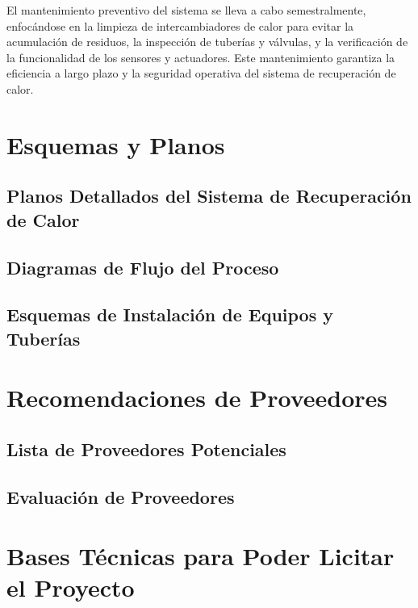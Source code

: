 \documentclass[11pt,a4paper]{article}  %
\begin{document}
El mantenimiento preventivo del sistema se lleva a cabo semestralmente, enfocándose en la limpieza de intercambiadores de calor para evitar la acumulación de residuos, la inspección de tuberías y válvulas, y la verificación de la funcionalidad de los sensores y actuadores. Este mantenimiento garantiza la eficiencia a largo plazo y la seguridad operativa del sistema de recuperación de calor.


\section{Esquemas y Planos}

\subsection{Planos Detallados del Sistema de Recuperación de Calor}

\subsection{Diagramas de Flujo del Proceso}

\subsection{Esquemas de Instalación de Equipos y Tuberías}

\section{Recomendaciones de Proveedores}

\subsection{Lista de Proveedores Potenciales}

\subsection{Evaluación de Proveedores}

\section{Bases Técnicas para Poder Licitar el Proyecto}
\end{document}
